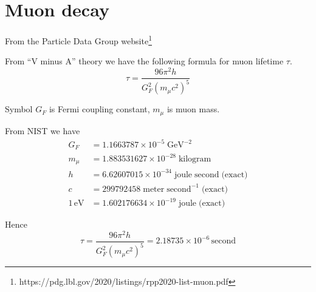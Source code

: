 

\section*{Muon decay}
From the Particle Data Group website\footnote{https://pdg.lbl.gov/2020/listings/rpp2020-list-muon.pdf}
%
\begin{center}
\end{center}

From ``V minus A'' theory we have the following formula for muon lifetime $\tau$.
\begin{equation*}
\tau=\frac{96\pi^2h}{G_F^2\left(m_\mu c^2\right)^5}
\end{equation*}

Symbol $G_F$ is Fermi coupling constant, $m_\mu$ is muon mass.

\bigskip
From NIST we have
\begin{align*}
G_F&=1.1663787\times10^{-5}\;\text{GeV}^{-2}
\\
m_\mu&=1.883531627\times10^{-28}\;\text{kilogram}
\\
h&=6.62607015\times10^{-34}\;\text{joule}\;\text{second}\;\text{(exact)}
\\
c&=299792458\;\text{meter}\;\text{second}^{-1}\;\text{(exact)}
\\
1\,\text{eV}&=1.602176634\times10^{-19}\;\text{joule}\;\text{(exact)}
\end{align*}

Hence
\begin{equation*}
\tau=\frac{96\pi^2h}{G_F^2\left(m_\mu c^2\right)^5}
=2.18735\times10^{-6}\,\text{second}
\end{equation*}

